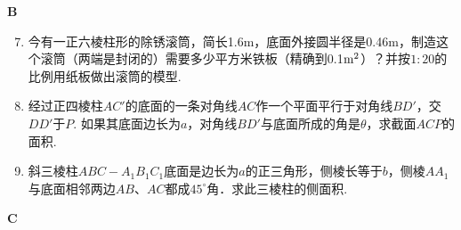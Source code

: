 \begin{center}
    \bfseries B
\end{center}

\begin{enumerate}\setcounter{enumi}{6}
    \item 今有一正六棱柱形的除锈滚筒，简长1.6m，底面外接圆半径是0.46m，制造这个滚筒（两端是封闭的）需要多少平方米铁板（精确到0.1${\rm m^2}$）？并按$1:20$的比例用纸板做出滚筒的模型.
    \item 经过正四棱柱$AC'$的底面的一条对角线$AC$作一个平面平行于对角线$BD'$，交$DD'$于$P$. 如果其底面边长为$a$，对角线$BD'$与底面所成的角是$\theta$，求截面$ACP$的面积.
    \item 斜三棱柱$ABC-A_1B_1C_1$底面是边长为$a$的正三角形，侧棱长等于$b$，侧棱$AA_1$与底面相邻两边$AB$、$AC$都成$45^{\circ}$角．求此三棱柱的侧面积.
\end{enumerate}

\begin{center}
    \bfseries C
\end{center}

